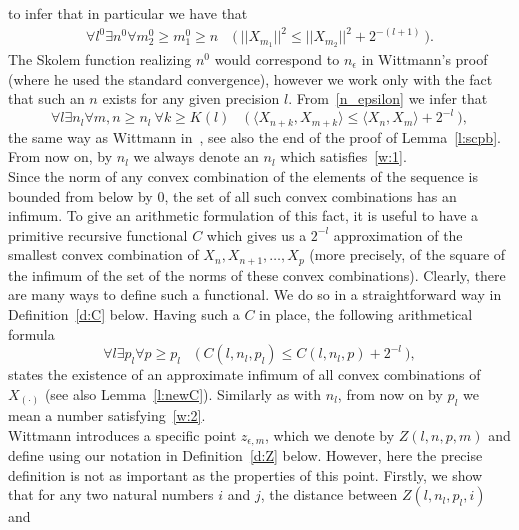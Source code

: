 to infer that in particular we have that
\begin{align}\forall l^0\exists n^0 \forall m_2^0\geq m_1^0\geq n\quad 
\big(\ ||X_{m_1}||^2 \leq ||X_{m_2}||^2 + 2^{-(l+1)}\ \big).\label{n_epsilon}\end{align}
The Skolem function realizing $n^0$ would correspond to $n_\epsilon$ in Wittmann's proof
(where he used the standard convergence), however we work only with 
the fact that such an $n$ exists for any given precision $l$. %
From~\ref{n_epsilon} we infer that
\[\forall l\exists n_l \forall m,n\geq n_l\ \forall k\geq K(l)\quad
 \big(\ \langle X_{n+k}, X_{m+k} \rangle \leq \langle X_{n}, X_{m} \rangle + 2^{-l}\ \big),\tag{W1}\label{w:1}\]
the same way as Wittmann in~\cite{Wittmann90}, see also the end of the proof of Lemma~\ref{l:scpb}.
From now on, by $n_l$ we always denote an $n_l$ which satisfies~\eqref{w:1}.\\
Since the norm of any convex combination of the elements of the sequence is bounded from below by $0$, the
set of all such convex combinations has an infimum. To give an arithmetic
formulation of this fact, it is useful to have a primitive recursive functional 
$C$ which gives us a $2^{-l}$ approximation of the smallest 
convex combination of $X_n, X_{n+1}, \ldots, X_p$
(more precisely, of the square of the infimum of the set of the norms of these convex combinations). 
Clearly, there are many ways to define such a functional. We do so in a straightforward 
way in Definition~\ref{d:C} below. Having such a $C$ in place,
the following arithmetical formula
\[
\forall l\exists p_l\forall p\geq p_l \quad  
\big(\ C(l,n_l,p_l) \leq C(l,n_l,p) + 2^{-l}\ \big),
 \tag{W2}\label{w:2} \]
states the existence of an approximate infimum of all convex combinations of $X_{(\cdot)}$
(see also Lemma~\ref{l:newC}). Similarly as with $n_l$, from now on by $p_l$ we mean
a number satisfying~\eqref{w:2}.\\
Wittmann introduces a specific point $z_{\epsilon,m}$, which we denote by $Z(l,n,p,m)$
and define using our notation in Definition~\ref{d:Z} below. However, here
the precise definition is not as important as the properties of this point.
Firstly, we show that for any two natural numbers $i$ and $j$, the distance between $Z(l,n_l,p_l,i)$ and
